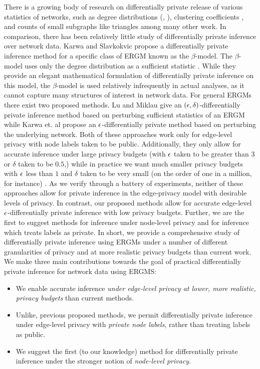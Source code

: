 There is a growing body of research on differentially private release of various statistics of networks, such as degree distributions (\cite{HLMJ09}, \cite{WNM16}), clustering coefficients \cite{WWZX12}, and counts of small subgraphs like triangles \cite{KRSY14} among many other work. In comparison, there has been relatively little study of differentially private inference over network data. Karwa and Slavkokvic propose a differentially private inference method for a specific class of ERGM known as the $\beta$-model. The $\beta$-model uses only the degree distribution as a sufficient statistic \cite{KS16}. While they provide an elegant mathematical formulation of differentially private inference on this model, the $\beta$-model is used relatively infrequently in actual analyses, as it cannot capture many structures of interest in network data. For general ERGMs there exist two proposed methods. Lu and Miklau \cite{LM14} give an $(\epsilon, \delta)$-differentially private inference method based on perturbing sufficient statistics of an ERGM while Karwa et. al \cite{KKS17} propose an $\epsilon$-differentially private method based on perturbing the underlying network. Both of these approaches work only for edge-level privacy with node labels taken to be public. Additionally, they only allow for accurate inference under large privacy budgets (with $\epsilon$ taken to be greater than $3$ or $\delta$ taken to be $0.5$,) while in practice we want much smaller privacy budgets with $\epsilon$ less than $1$ and $\delta$ taken to be very small (on the order of one in a million, for instance) \cite{N17}. As we verify through a battery of experiments, neither of these approaches allow for private inference in the edge-privacy model with desirable levels of privacy. In contrast, our proposed methods allow for accurate edge-level $\epsilon$-differentially private inference with low privacy budgets. Further, we are the first to suggest methods for inference under node-level privacy and for inference which treats labels as private. In short, we provide a comprehensive study of differentially private inference using ERGMs under a number of different granularities of privacy and at more realistic privacy budgets than current work. We make three main contributions towards the goal of practical differentially private inference for network data using ERGMS:
\begin{itemize}
	\item We enable accurate inference \emph{under edge-level privacy at lower, more realistic, privacy budgets} than current methods.
	\item Unlike, previous proposed methods, we permit differentially private inference under edge-level privacy with \emph{private node labels}, rather than treating labels as public.
	\item We suggest the first (to our knowledge) method for differentially private inference under the stronger notion of \emph{node-level privacy}.
\end{itemize}

